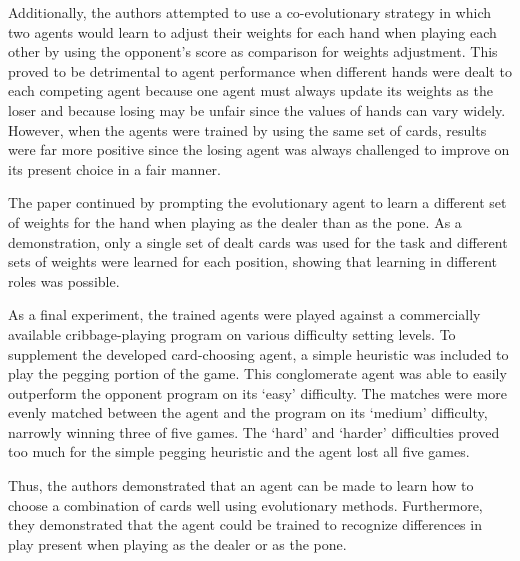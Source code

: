 Additionally,
the authors attempted to use a co-evolutionary strategy in which
two agents would learn to adjust their weights for each hand when playing each
other by using the opponent's score as comparison for weights adjustment.
%
This proved to be detrimental to agent performance when different hands were
dealt to each competing agent
because one agent must always update its weights
as the loser
and because losing may be unfair since the values of hands can vary widely.
%
However,
when the agents were trained by using the same set of cards,
results were far more positive since the losing agent was always challenged to
improve on its present choice in a fair manner.

The paper continued by prompting the evolutionary agent to learn a different set
of weights for the hand
when playing as the dealer than as the pone.
%
As a demonstration,
only a single set of dealt cards was used for the task
and different sets of weights were learned for each position,
showing that learning in different roles was possible.

As a final experiment,
the trained agents were played against a commercially available cribbage-playing
program on various difficulty setting levels.
%
To supplement the developed card-choosing agent,
a simple heuristic was included to play the pegging portion of the game.
%
This conglomerate agent was able to easily outperform the opponent program
on its `easy' difficulty.
%
The matches were more evenly matched between the agent and the program on
its `medium' difficulty,
narrowly winning three of five games.
%
The `hard' and `harder' difficulties proved too much for the simple pegging
heuristic
and the agent lost all five games.

Thus,
the authors demonstrated that an agent can be made to learn how to choose a
combination of cards well using evolutionary methods.
%
Furthermore,
they demonstrated that the agent could be trained to recognize differences
in play present when playing as the dealer or as the pone.

